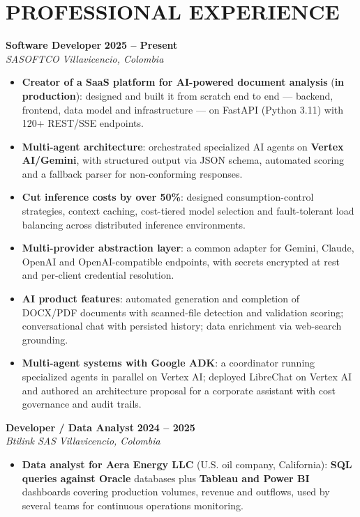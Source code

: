 \documentclass[letterpaper,10pt]{article}
\begin{document}
\section{PROFESSIONAL EXPERIENCE}

\textbf{Software Developer} \hfill \textbf{2025 -- Present} \\
\textit{SASOFTCO} \hfill \textit{Villavicencio, Colombia}
\begin{itemize}
    \item \textbf{Creator of a SaaS platform for AI-powered document analysis} (\textbf{in production}): designed and built it from scratch end to end — backend, frontend, data model and infrastructure — on FastAPI (Python 3.11) with 120+ REST/SSE endpoints.
    \item \textbf{Multi-agent architecture}: orchestrated specialized AI agents on \textbf{Vertex AI/Gemini}, with structured output via JSON schema, automated scoring and a fallback parser for non-conforming responses.
    \item \textbf{Cut inference costs by over 50\%}: designed consumption-control strategies, context caching, cost-tiered model selection and fault-tolerant load balancing across distributed inference environments.
    \item \textbf{Multi-provider abstraction layer}: a common adapter for Gemini, Claude, OpenAI and OpenAI-compatible endpoints, with secrets encrypted at rest and per-client credential resolution.
    \item \textbf{AI product features}: automated generation and completion of DOCX/PDF documents with scanned-file detection and validation scoring; conversational chat with persisted history; data enrichment via web-search grounding.
    \item \textbf{Multi-agent systems with Google ADK}: a coordinator running specialized agents in parallel on Vertex AI; deployed LibreChat on Vertex AI and authored an architecture proposal for a corporate assistant with cost governance and audit trails.
\end{itemize}

\textbf{Developer / Data Analyst} \hfill \textbf{2024 -- 2025} \\
\textit{Btilink SAS} \hfill \textit{Villavicencio, Colombia}
\begin{itemize}
    \item \textbf{Data analyst for Aera Energy LLC} (U.S. oil company, California): \textbf{SQL queries against Oracle} databases plus \textbf{Tableau and Power BI} dashboards covering production volumes, revenue and outflows, used by several teams for continuous operations monitoring.
\end{itemize}
\end{document}
